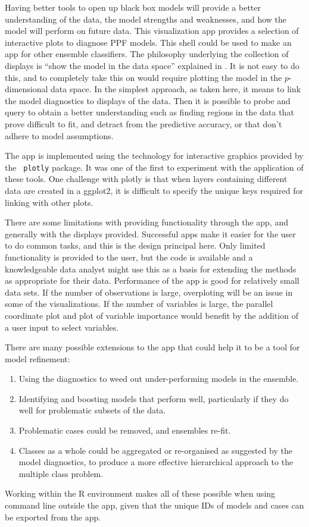 \documentclass[smallextended,natbib]{svjour3}\usepackage[]{graphicx}\usepackage[]{xcolor}
\begin{document}
Having better tools to open up black box models will provide a better understanding of the data, the model strengths and weaknesses, and how the model will perform on future data. This visualization app provides a selection of interactive plots to diagnose PPF models. This shell could be used to make an app for other ensemble classifiers. The philosophy underlying the collection of displays is ``show the model in the data space''  explained in \citet{wickham2015visualizing}. It is not easy to do this, and to completely take this on would require plotting the model in the $p$-dimensional data space. In the simplest approach, as taken here, it means to link the model diagnostics to displays of the data. Then it is possible to probe and query to obtain a better understanding such as finding regions in the data that prove difficult to fit, and detract from the predictive accuracy, or that don't adhere to model assumptions.

The app is implemented using the technology for interactive graphics provided by the \verb# plotly# package. It was one of the first to experiment with the application of these tools. One challenge with plotly is that  when layers containing different data are created in a ggplot2, it is difficult to specify the unique keys required for linking with other plots.

There are some limitations with providing functionality through the app, and generally with the displays provided. Successful apps make it easier for the user to do common tasks, and this is the design principal here. Only limited functionality is provided to the user, but the code is available and a knowledgeable data analyst might use this as a basis for extending the methods as appropriate for their data. Performance of the app is good for relatively small data sets. If the number of observations is large, overploting will be an issue in some of the visualizations. If the number of variables is large, the parallel coordinate plot and plot of variable importance would benefit by the addition of a user input to select variables.

There are many possible extensions to the app that could help it to be a tool for model refinement:

\begin{enumerate}
\item Using the diagnostics to weed out under-performing models in the ensemble.
\item Identifying and boosting models that perform well, particularly if they do well for problematic subsets of the data.
\item Problematic cases could be removed, and ensembles re-fit.
\item Classes as a whole could be aggregated or re-organised as suggested by the model diagnostics, to produce a more effective hierarchical approach to the multiple class problem.
\end{enumerate}
\noindent Working within the R environment makes all of these possible when using command line outside the app, given that the unique IDs of models and cases can be exported from the app.
\end{document}
